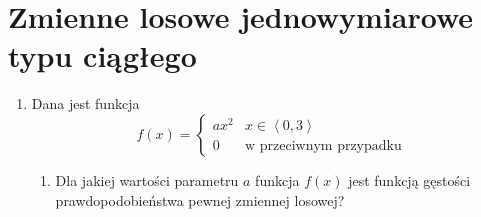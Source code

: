 \documentclass[twoside]{mwart}
\newcommand{\ans}[1]{}
\newenvironment{ansenv}{\comment}{\endcomment}
\newenvironment{ansenv}{\paragraph{Odpowiedź:}}{}
\newcommand{\ans}[1]{\begin{ansenv}#1\end{ansenv}}
\begin{document}
\clearpage
\section{Zmienne losowe jednowymiarowe typu ciągłego}

\begin{enumerate}
\item Dana jest funkcja 
\[ f(x)=\begin{cases} ax^2 & x\in \left<0,3\right> \\ 0 & \text{w przeciwnym przypadku} \end{cases} \]
\begin{enumerate}
\item Dla jakiej wartości parametru $a$ funkcja $f(x)$ jest funkcją gęstości prawdopodobieństwa pewnej zmiennej losowej?
\ans{
	Żeby funkcja była funkcją gęstości prawdopodobieństwa pewnej zmiennej losowej muszą być jednocześnie spełnione dwa warunki:
	\begin{enumerate}
		\item Całka oznaczona od $-\infty$ do $\infty$ z tej funkcji jest równa 1:
		\[ \int_{-\infty}^\infty f(x)\,dx=1\]
		\item Funkcja jest nieujemna dla dowolnego argumentu:

\end{enumerate}}
\end{enumerate}
\end{enumerate}
\end{document}
